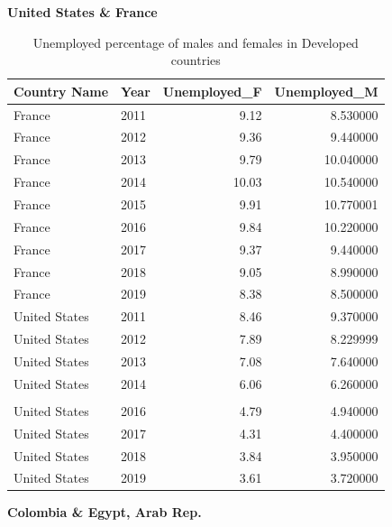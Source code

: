 \documentclass[
]{article}
\begin{document}
\textbf{United States \& France}

\begin{table}[H]

\caption{\label{tab:tabref}Unemployed percentage of males and females in Developed countries}
\centering
\begin{tabular}[t]{l|l|r|r}
\hline
Country Name & Year & Unemployed\_F & Unemployed\_M\\
\hline
France & 2011 & 9.12 & 8.530000\\
\hline
France & 2012 & 9.36 & 9.440000\\
\hline
France & 2013 & 9.79 & 10.040000\\
\hline
France & 2014 & 10.03 & 10.540000\\
\hline
France & 2015 & 9.91 & 10.770001\\
\hline
France & 2016 & 9.84 & 10.220000\\
\hline
France & 2017 & 9.37 & 9.440000\\
\hline
France & 2018 & 9.05 & 8.990000\\
\hline
France & 2019 & 8.38 & 8.500000\\
\hline
United States & 2011 & 8.46 & 9.370000\\
\hline
United States & 2012 & 7.89 & 8.229999\\
\hline
United States & 2013 & 7.08 & 7.640000\\
\hline
United States & 2014 & 6.06 & 6.260000\\
\hline
\cellcolor{red}{\textcolor{white}{\textbf{United States}}} & \cellcolor{red}{\textcolor{white}{\textbf{2015}}} & \cellcolor{red}{\textcolor{white}{\textbf{5.18}}} & \cellcolor{red}{\textcolor{white}{\textbf{5.370000}}}\\
\hline
United States & 2016 & 4.79 & 4.940000\\
\hline
United States & 2017 & 4.31 & 4.400000\\
\hline
United States & 2018 & 3.84 & 3.950000\\
\hline
United States & 2019 & 3.61 & 3.720000\\
\hline
\end{tabular}
\end{table}

\textbf{Colombia \& Egypt, Arab Rep.}
\end{document}

